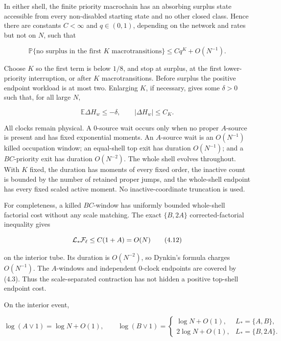 In either shell, the finite priority macrochain has an absorbing surplus
state accessible from every non-disabled starting state and no other
closed class. Hence there are constants \(C<\infty\) and \(q\in(0,1)\),
depending on the network and rates but not on \(N\), such that

\[
 \mathbb P\{\text{no surplus in the first \(K\) macrotransitions}\}
 \le Cq^K+O(N^{-1}).                                   \tag{4.10}
\]

Choose \(K\) so the first term is below \(1/8\), and stop at surplus, at
the first lower-priority interruption, or after \(K\) macrotransitions.
Before surplus the positive endpoint workload is at most two. Enlarging
\(K\), if necessary, gives some \(\delta>0\) such that, for all large
\(N\),

\[
 \mathbb E\Delta H_w\le-\delta,
 \qquad |\Delta H_w|\le C_K.                           \tag{4.11}
\]

All clocks remain physical. A \(0\)-source wait occurs only when no
proper \(A\)-source is present and has fixed exponential moments. An
\(A\)-source wait is an \(O(N^{-1})\) killed occupation window; an
equal-shell top exit has duration \(O(N^{-1})\); and a \(BC\)-priority
exit has duration \(O(N^{-2})\). The whole shell evolves throughout.
With \(K\) fixed, the duration has moments of every fixed order, the
inactive count is bounded by the number of retained proper jumps, and
the whole-shell endpoint has every fixed scaled active moment. No
inactive-coordinate truncation is used.

For completeness, a killed \(BC\)-window has uniformly bounded
whole-shell factorial cost without any scale matching. The exact
\(\{B,2A\}\) corrected-factorial inequality gives

\[
 {\cal L}_*{\cal F}_\ell\le C(1+A)=O(N)                \tag{4.12}
\]

on the interior tube. Its duration is \(O(N^{-2})\), so Dynkin's formula
charges \(O(N^{-1})\). The \(A\)-windows and independent \(0\)-clock
endpoints are covered by (4.3). Thus the scale-separated contraction has
not hidden a positive top-shell endpoint cost.

On the interior event,

\[
 \log(A\vee1)=\log N+O(1),\qquad
 \log(B\vee1)=
 \begin{cases}
   \log N+O(1),&L_*=\{A,B\},\\
   2\log N+O(1),&L_*=\{B,2A\}.
 \end{cases}                                           \tag{4.13}
\]

